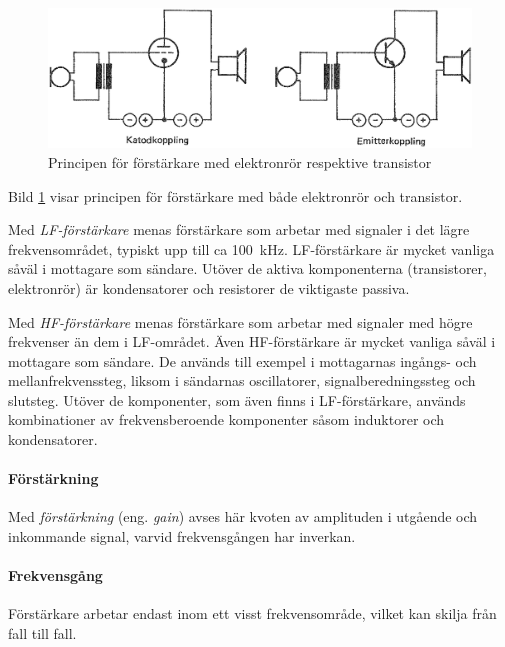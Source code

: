 \begin{figure}
\includegraphics[width=\textwidth]{images/cropped_pdfs/bild_2_3-41.pdf}
\caption{Principen för förstärkare med elektronrör respektive transistor}
\label{fig:BildII3-41}
\end{figure}

Bild \ref{fig:BildII3-41} visar principen för förstärkare med både elektronrör
och transistor.

Med \emph{LF-förstärkare} menas förstärkare som arbetar med signaler i
det lägre frekvensområdet, typiskt upp till ca 100~kHz.
LF-förstärkare är mycket vanliga såväl i mottagare som sändare.
Utöver de aktiva komponenterna (transistorer, elektronrör) är kondensatorer
och resistorer de viktigaste passiva.

Med \emph{HF-förstärkare} menas förstärkare som arbetar med signaler
med högre frekvenser än dem i LF-området.
Även HF-förstärkare är mycket vanliga såväl i mottagare som sändare.
De används till exempel i mottagarnas ingångs- och mellanfrekvenssteg, liksom i
sändarnas oscillatorer, signalberedningssteg och slutsteg.
Utöver de komponenter, som även finns i LF-förstärkare, används kombinationer av
frekvensberoende komponenter såsom induktorer och kondensatorer.

\paragraph{Förstärkning}

Med \emph{förstärkning} (eng. \emph{gain}) avses här kvoten av amplituden i
utgående och inkommande signal, varvid frekvensgången har inverkan.

\paragraph{Frekvensgång}
Förstärkare arbetar endast inom ett visst frekvensområde, vilket kan
skilja från fall till fall.

